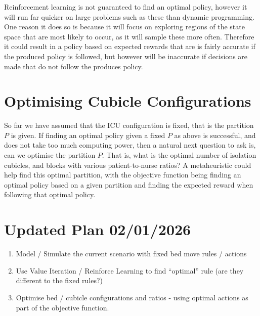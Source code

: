 \documentclass{article}
\begin{document}
Reinforcement learning is not guaranteed to find an optimal policy, however it will run far quicker on large problems such as these than dynamic programming.
One reason it does so is because it will focus on exploring regions of the state space that are most likely to occur, as it will sample these more often.
Therefore it could result in a policy based on expected rewards that are is fairly accurate if the produced policy is followed, but however will be inaccurate if decisions are made that do not follow the produces policy.


\section{Optimising Cubicle Configurations}
So far we have assumed that the ICU configuration is fixed, that is the partition $P$ is given.
If finding an optimal policy given a fixed $P$ as above is successful, and does not take too much computing power, then a natural next question to ask is, can we optimise the partition $P$.
That is, what is the optimal number of isolation cubicles, and blocks with various patient-to-nurse ratios?
A metaheuristic could help find this optimal partition, with the objective function being finding an optimal policy based on a given partition and finding the expected reward when following that optimal policy.



\newpage

\section{Updated Plan 02/01/2026}

\begin{enumerate}
  \item Model / Simulate the current scenario with fixed bed move rules / actions
  \item Use Value Iteration / Reinforce Learning to find ``optimal'' rule (are they different to the fixed rules?)
  \item Optimise bed / cubicle configurations and ratios - using optimal actions as part of the objective function.
\end{enumerate}
\end{document}
